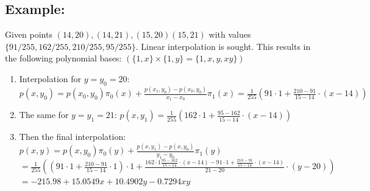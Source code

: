 \subsection{Example:}
Given points $(14,20),(14,21),(15,20)(15,21)$ with values $\{91/255, 162/255, 210/255, 95/255\}$. Linear interpolation is sought. 
This results in the following polynomial bases: $(\{1,x\}\times\{1,y\}=\{1,x,y,xy\})$\\
\begin{enumerate}
  \item Interpolation for $y=y_0=20$: $p(x,y_0)= p(x_0,y_0) \pi_0(x) + \frac{p(x_1,y_0)-p(x_0,y_0)}{x_1-x_0}\pi_1(x)=\frac{1}{255}\left(91 \cdot 1 + \frac{210-91}{15-14}\cdot(x-14)\right)$
  \item The same for $y=y_1=21$:  $p(x,y_1)=\frac{1}{255}\left(162 \cdot 1 + \frac{95-162}{15-14}\cdot(x-14)\right)$
  \item Then the final interpolation: $p(x,y)=p(x,y_0)\pi_0(y)+\frac{p(x,y_1)-p(x,y_0)}{y_1-y_0}\pi_1(y)$\\
  $=\frac 1{255} \left((91\cdot 1 +\frac{210-91}{15-14}\cdot 1)\cdot 1 + \frac{162\cdot 1 \frac{95-162}{15-14}\cdot (x-14)-91\cdot 1 + \frac{210-91}{15-14}\cdot(x-14)}{21-20}\cdot(y-20)\right)$
  $=-215.98 + 15.0549 x + 10.4902 y - 0.7294 x y$
\end{enumerate}

